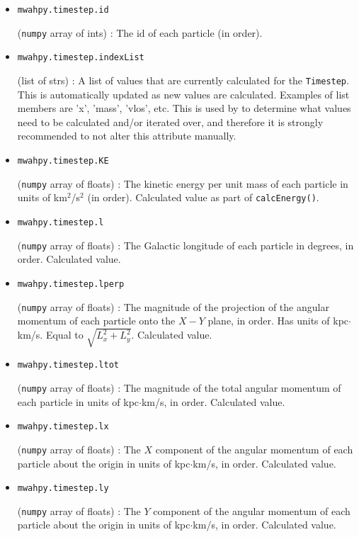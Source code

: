 \documentclass{article}
\begin{document}
\begin{itemize}
\item \verb!mwahpy.timestep.id!

(\verb!numpy! array of ints) : The id of each particle (in order). 

\item \verb!mwahpy.timestep.indexList!

(list of strs) : A list of values that are currently calculated for the \verb!Timestep!. This is automatically updated as new values are calculated. Examples of list members are 'x', 'mass', 'vlos', etc. This is used by \mwahpy to determine what values need to be calculated and/or iterated over, and therefore it is strongly recommended to not alter this attribute manually.

\item \verb!mwahpy.timestep.KE!

(\verb!numpy! array of floats) : The kinetic energy per unit mass of each particle in units of km$^2$/s$^2$ (in order). Calculated value as part of \verb!calcEnergy()!. 

\item \verb!mwahpy.timestep.l!

(\verb!numpy! array of floats) : The Galactic longitude of each particle in degrees, in order. Calculated value.

\item \verb!mwahpy.timestep.lperp!

(\verb!numpy! array of floats) : The magnitude of the projection of the angular momentum of each particle onto the $X-Y$ plane, in order. Has units of kpc$\cdot$km/s. Equal to $\sqrt{L_x^2 + L_y^2}.$ Calculated value.

\item \verb!mwahpy.timestep.ltot!

(\verb!numpy! array of floats) : The magnitude of the total angular momentum of each particle in units of kpc$\cdot$km/s, in order. Calculated value.

\item \verb!mwahpy.timestep.lx!

(\verb!numpy! array of floats) : The $X$ component of the angular momentum of each particle about the origin in units of kpc$\cdot$km/s, in order. Calculated value.

\item \verb!mwahpy.timestep.ly!

(\verb!numpy! array of floats) : The $Y$ component of the angular momentum of each particle about the origin in units of kpc$\cdot$km/s, in order. Calculated value.


\end{itemize}
\end{document}
